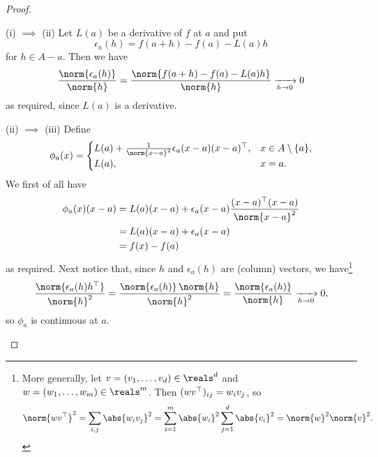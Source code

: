 \documentclass[article, a4paper, 11pt, oneside]{memoir}
\numberwithin{equation}{chapter}
\begin{document}
\begin{proof}
    \begin{proofsec}
        \item[(i) $\implies$ (ii)]
        Let $L(a)$ be a derivative of $f$ at $a$ and put
        \begin{equation*}
            \epsilon_a(h)
                = f(a+h) - f(a) - L(a)h
        \end{equation*}
        for $h \in A - a$. Then we have
        \begin{equation*}
            \frac{\norm{\epsilon_a(h)}}{\norm{h}}
                = \frac{\norm{f(a+h) - f(a) - L(a)h}}{\norm{h}}
                \xrightarrow[h \to 0]{} 0
        \end{equation*}
        as required, since $L(a)$ is a derivative.
    
        \item[(ii) $\implies$ (iii)]
        Define
        \begin{equation*}
            \phi_a(x) =
            \begin{cases}
                L(a) + \frac{1}{\norm{x-a}^2} \epsilon_a(x-a)(x-a)\trans,
                    & x \in A \setminus \{a\}, \\
                L(a),
                    & x = a.
            \end{cases}
        \end{equation*}
        We first of all have
        \begin{align*}
            \phi_a(x)(x-a)
                &= L(a)(x-a) + \epsilon_a(x-a) \frac{(x-a)\trans (x-a)}{\norm{x-a}^2} \\
                &= L(a)(x-a) + \epsilon_a(x-a) \\
                &= f(x) - f(a)
        \end{align*}
        as required. Next notice that, since $h$ and $\epsilon_a(h)$ are (column) vectors, we have\footnote{More generally, let $v = (v_1, \ldots, v_d) \in \reals^d$ and $w = (w_1, \ldots, w_m) \in \reals^m$. Then $(wv^{\top})_{ij} = w_i v_j$, so
        \begin{equation*}
            \norm{wv\trans}^2
                = \sum_{i,j} \abs{w_i v_j}^2
                = \sum_{i=1}^m \abs{w_i}^2 \sum_{j=1}^d \abs{v_i}^2
                = \norm{w}^2 \norm{v}^2.
        \end{equation*}}
        \begin{equation*}
            \frac{\norm{\epsilon_a(h) h\trans}}{\norm{h}^2}
                = \frac{\norm{\epsilon_a(h)} \, \norm{h}}{\norm{h}^2}
                = \frac{\norm{\epsilon_a(h)}}{\norm{h}}
                \xrightarrow[h \to 0]{} 0,
        \end{equation*}
        so $\phi_a$ is continuous at $a$.
    

\end{proofsec}
\end{proof}
\end{document}
